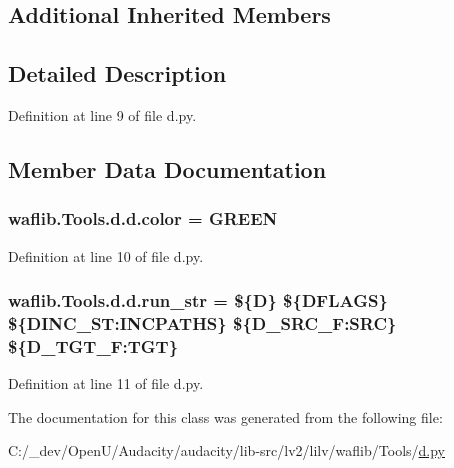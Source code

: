 \subsection*{Additional Inherited Members}


\subsection{Detailed Description}


Definition at line 9 of file d.\+py.



\subsection{Member Data Documentation}
\subsubsection[{\texorpdfstring{color}{color}}]{ waflib.\+Tools.\+d.\+d.\+color = \textquotesingle{}G\+R\+E\+EN\textquotesingle{}\hspace{0.3cm}{\ttfamily [static]}}\hypertarget{classwaflib_1_1_tools_1_1d_1_1d_a41978a80eab929f2c357f60271f98eb1}{}\label{classwaflib_1_1_tools_1_1d_1_1d_a41978a80eab929f2c357f60271f98eb1}


Definition at line 10 of file d.\+py.

\subsubsection[{\texorpdfstring{run\+\_\+str}{run_str}}]{ waflib.\+Tools.\+d.\+d.\+run\+\_\+str = \textquotesingle{}\$\{{\bf D}\} \$\{D\+F\+L\+A\+GS\} \$\{D\+I\+N\+C\+\_\+\+S\+T\+:\+I\+N\+C\+P\+A\+T\+HS\} \$\{D\+\_\+\+S\+R\+C\+\_\+\+F\+:\+S\+RC\} \$\{D\+\_\+\+T\+G\+T\+\_\+\+F\+:\+T\+GT\}\textquotesingle{}\hspace{0.3cm}{\ttfamily [static]}}\hypertarget{classwaflib_1_1_tools_1_1d_1_1d_a19fcda55ff63e305a3e131e159e02e21}{}\label{classwaflib_1_1_tools_1_1d_1_1d_a19fcda55ff63e305a3e131e159e02e21}


Definition at line 11 of file d.\+py.



The documentation for this class was generated from the following file\+:\begin{DoxyCompactItemize}
\item 
C\+:/\+\_\+dev/\+Open\+U/\+Audacity/audacity/lib-\/src/lv2/lilv/waflib/\+Tools/\hyperlink{lilv_2waflib_2_tools_2d_8py}{d.\+py}\end{DoxyCompactItemize}
